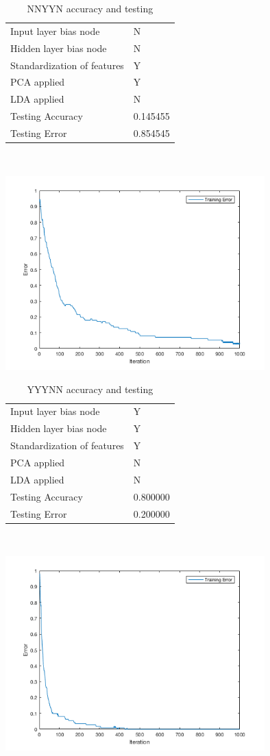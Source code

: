 \documentclass[12pt]{article}
\newcommand{\accuracyAndTestErrorTable}[8]{
  \begin{tabular}{l|l}
    \hline
    Input layer bias node & #1 \\
    Hidden layer bias node & #2 \\
    Standardization of features & #3 \\
    PCA applied & #4 \\
    LDA applied & #5 \\
    \hline
    Testing Accuracy & #6 \\
    Testing Error & #7 \\
    \hline
  \end{tabular}
  ~\\[60pt]
  \caption{#8}
}
\begin{document}


\begin{center}
  \begin{table}[H]
    \begin{varwidth}[b]{0.4\linewidth}
      \centering
      \accuracyAndTestErrorTable{N}{N}{Y}{Y}{N}{0.145455}{0.854545}{NNYYN accuracy and testing}
      \label{table:NNYYN}
    \end{varwidth}%
    \hfill
    \begin{minipage}[b]{0.6\linewidth}
      \centering
      \includegraphics[width=100mm]{NNYYN_training_error.png}
      \label{fig:NNYYN}
    \end{minipage}
  \end{table}
\end{center}




\begin{center}
  \begin{table}[H]
    \begin{varwidth}[b]{0.4\linewidth}
      \centering
      \accuracyAndTestErrorTable{Y}{Y}{Y}{N}{N}{0.800000}{0.200000}{YYYNN accuracy and testing}
      \label{table:YYYNN}
    \end{varwidth}%
    \hfill
    \begin{minipage}[b]{0.6\linewidth}
      \centering
      \includegraphics[width=100mm]{YYYNN_training_error.png}
      \label{fig:YYYNN}
    \end{minipage}
  \end{table}
\end{center}
\end{document}
